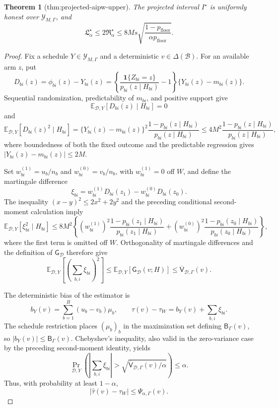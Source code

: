 \documentclass{article}
\newtheorem{theorem}{Theorem}
\begin{document}
\begin{theorem}[thm:projected-aipw-upper]\label{thm:projected-aipw-upper}
The projected interval \(I^\star\) is uniformly honest over \(\mathcal Y_{M,\Gamma}\), and \[\mathfrak L_\alpha^\star\le2\mathfrak R_\alpha^\star\le 8Ms\sqrt{\frac{1-p_{\mathrm{floor}}}{\alpha p_{\mathrm{floor}}}}.\]
\end{theorem}
\begin{proof}
Fix a schedule \(Y\in\mathcal Y_{M,\Gamma}\) and a deterministic \(v\in\Delta(\mathcal B)\).  For an available arm \(z\), put
\[
 D_{bi}(z)=\phi_{bi}(z)-Y_{bi}(z)
 =\left\{\frac{\mathbf 1\{Z_{bi}=z\}}{p_{bi}(z\mid H_{bi})}-1\right\}
   \{Y_{bi}(z)-m_{bi}(z)\}.
\]
Sequential randomization, predictability of \(m_{bi}\), and positive support give
\[
 \mathbb E_{\mathcal D,Y}[D_{bi}(z)\mid H_{bi}]=0
\]
and
\[
 \mathbb E_{\mathcal D,Y}[D_{bi}(z)^2\mid H_{bi}]
 =\{Y_{bi}(z)-m_{bi}(z)\}^2
   \frac{1-p_{bi}(z\mid H_{bi})}{p_{bi}(z\mid H_{bi})}
 \le4M^2\frac{1-p_{bi}(z\mid H_{bi})}{p_{bi}(z\mid H_{bi})},
\]
where boundedness of both the fixed outcome and the predictable regression gives \(|Y_{bi}(z)-m_{bi}(z)|\le2M\).

Set \(w^{(1)}_{bi}=u_b/n_b\) and \(w^{(0)}_{bi}=v_b/n_b\), with \(w^{(1)}_{bi}=0\) off \(W\), and define the martingale difference
\[
 \xi_{bi}=w^{(1)}_{bi}D_{bi}(z_1)-w^{(0)}_{bi}D_{bi}(z_0).
\]
The inequality \((x-y)^2\le2x^2+2y^2\) and the preceding conditional second-moment calculation imply
\[
 \mathbb E_{\mathcal D,Y}[\xi_{bi}^2\mid H_{bi}]
 \le8M^2\left\{(w^{(1)}_{bi})^2
 \frac{1-p_{bi}(z_1\mid H_{bi})}{p_{bi}(z_1\mid H_{bi})}
 +(w^{(0)}_{bi})^2
 \frac{1-p_{bi}(z_0\mid H_{bi})}{p_{bi}(z_0\mid H_{bi})}\right\},
\]
where the first term is omitted off \(W\).  Orthogonality of martingale differences and the definition of \(\mathsf G_{\mathcal D}\) therefore give
\[
 \mathbb E_{\mathcal D,Y}\left[\left(\sum_{b,i}\xi_{bi}\right)^2\right]
 \le \mathbb E_{\mathcal D,Y}[\mathsf G_{\mathcal D}(v;H)]
 \le\overline{\mathsf V}_{\mathcal D,\Gamma}(v).
\]

The deterministic bias of the estimator is
\[
 b_Y(v)=\sum_{b=1}^B(u_b-v_b)\mu_b,
 \qquad
 \widehat\tau(v)-\tau_W=b_Y(v)+\sum_{b,i}\xi_{bi}.
\]
The schedule restriction places \((\mu_b)_b\) in the maximization set defining \(\mathsf B_\Gamma(v)\), so \(|b_Y(v)|\le\mathsf B_\Gamma(v)\).  Chebyshev's inequality, also valid in the zero-variance case by the preceding second-moment identity, yields
\[
 \Pr_{\mathcal D,Y}\!\left(
 \left|\sum_{b,i}\xi_{bi}\right|>
 \sqrt{\overline{\mathsf V}_{\mathcal D,\Gamma}(v)/\alpha}
 \right)\le\alpha.
\]
Thus, with probability at least \(1-\alpha\),
\[
 |\widehat\tau(v)-\tau_W|
 \le\Psi_{\alpha,\Gamma}(v).
\]


\end{proof}
\end{document}
